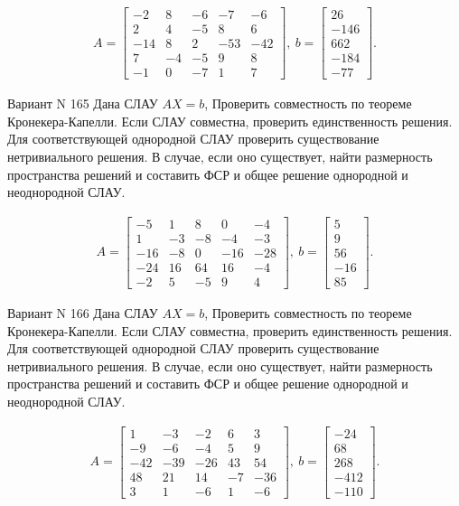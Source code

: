 \documentclass[11pt]{report}
\begin{document}
\begin{align*}
 A = \left[\begin{matrix}-2 & 8 & -6 & -7 & -6\\2 & 4 & -5 & 8 & 6\\-14 & 8 & 2 & -53 & -42\\7 & -4 & -5 & 9 & 8\\-1 & 0 & -7 & 1 & 7\end{matrix}\right],
\ b = \left[\begin{matrix}26\\-146\\662\\-184\\-77\end{matrix}\right]. 
 \end{align*}

Вариант N 165
Дана СЛАУ $AX = b$,
Проверить совместность по теореме Кронекера-Капелли. Если СЛАУ совместна, проверить единственность решения.
Для соответствующей однородной СЛАУ проверить существование нетривиального решения. В случае, если оно существует,
найти размерность пространства решений и составить ФСР и общее решение однородной  и неоднородной СЛАУ.


\begin{align*}
 A = \left[\begin{matrix}-5 & 1 & 8 & 0 & -4\\1 & -3 & -8 & -4 & -3\\-16 & -8 & 0 & -16 & -28\\-24 & 16 & 64 & 16 & -4\\-2 & 5 & -5 & 9 & 4\end{matrix}\right],
\ b = \left[\begin{matrix}5\\9\\56\\-16\\85\end{matrix}\right]. 
 \end{align*}

Вариант N 166
Дана СЛАУ $AX = b$,
Проверить совместность по теореме Кронекера-Капелли. Если СЛАУ совместна, проверить единственность решения.
Для соответствующей однородной СЛАУ проверить существование нетривиального решения. В случае, если оно существует,
найти размерность пространства решений и составить ФСР и общее решение однородной  и неоднородной СЛАУ.


\begin{align*}
 A = \left[\begin{matrix}1 & -3 & -2 & 6 & 3\\-9 & -6 & -4 & 5 & 9\\-42 & -39 & -26 & 43 & 54\\48 & 21 & 14 & -7 & -36\\3 & 1 & -6 & 1 & -6\end{matrix}\right],
\ b = \left[\begin{matrix}-24\\68\\268\\-412\\-110\end{matrix}\right]. 
 \end{align*}
\end{document}
